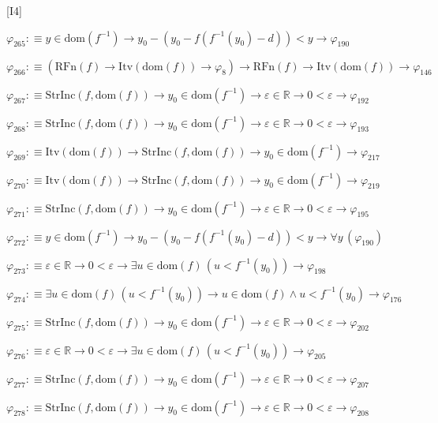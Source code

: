 \begin{fullproof}{[I4]}
\begin{abbrevlist}
\item $\varphi_{265} :\equiv y \in \mathrm{dom}(f^{-1}) \to y_{0} - (y_{0} - f(f^{-1}(y_{0}) - d)) < y \to \varphi_{190}$
\item $\varphi_{266} :\equiv (\mathrm{RFn}(f) \to \mathrm{Itv}(\mathrm{dom}(f)) \to \varphi_{8}) \to \mathrm{RFn}(f) \to \mathrm{Itv}(\mathrm{dom}(f)) \to \varphi_{146}$
\item $\varphi_{267} :\equiv \mathrm{StrInc}(f,\mathrm{dom}(f)) \to y_{0} \in \mathrm{dom}(f^{-1}) \to \varepsilon \in \mathbb{R} \to 0 < \varepsilon \to \varphi_{192}$
\item $\varphi_{268} :\equiv \mathrm{StrInc}(f,\mathrm{dom}(f)) \to y_{0} \in \mathrm{dom}(f^{-1}) \to \varepsilon \in \mathbb{R} \to 0 < \varepsilon \to \varphi_{193}$
\item $\varphi_{269} :\equiv \mathrm{Itv}(\mathrm{dom}(f)) \to \mathrm{StrInc}(f,\mathrm{dom}(f)) \to y_{0} \in \mathrm{dom}(f^{-1}) \to \varphi_{217}$
\item $\varphi_{270} :\equiv \mathrm{Itv}(\mathrm{dom}(f)) \to \mathrm{StrInc}(f,\mathrm{dom}(f)) \to y_{0} \in \mathrm{dom}(f^{-1}) \to \varphi_{219}$
\item $\varphi_{271} :\equiv \mathrm{StrInc}(f,\mathrm{dom}(f)) \to y_{0} \in \mathrm{dom}(f^{-1}) \to \varepsilon \in \mathbb{R} \to 0 < \varepsilon \to \varphi_{195}$
\item $\varphi_{272} :\equiv y \in \mathrm{dom}(f^{-1}) \to y_{0} - (y_{0} - f(f^{-1}(y_{0}) - d)) < y \to \forall y\,(\varphi_{190})$
\item $\varphi_{273} :\equiv \varepsilon \in \mathbb{R} \to 0 < \varepsilon \to \exists u \in \mathrm{dom}(f)\,(u < f^{-1}(y_{0})) \to \varphi_{198}$
\item $\varphi_{274} :\equiv \exists u \in \mathrm{dom}(f)\,(u < f^{-1}(y_{0})) \to u \in \mathrm{dom}(f) \land u < f^{-1}(y_{0}) \to \varphi_{176}$
\item $\varphi_{275} :\equiv \mathrm{StrInc}(f,\mathrm{dom}(f)) \to y_{0} \in \mathrm{dom}(f^{-1}) \to \varepsilon \in \mathbb{R} \to 0 < \varepsilon \to \varphi_{202}$
\item $\varphi_{276} :\equiv \varepsilon \in \mathbb{R} \to 0 < \varepsilon \to \exists u \in \mathrm{dom}(f)\,(u < f^{-1}(y_{0})) \to \varphi_{205}$
\item $\varphi_{277} :\equiv \mathrm{StrInc}(f,\mathrm{dom}(f)) \to y_{0} \in \mathrm{dom}(f^{-1}) \to \varepsilon \in \mathbb{R} \to 0 < \varepsilon \to \varphi_{207}$
\item $\varphi_{278} :\equiv \mathrm{StrInc}(f,\mathrm{dom}(f)) \to y_{0} \in \mathrm{dom}(f^{-1}) \to \varepsilon \in \mathbb{R} \to 0 < \varepsilon \to \varphi_{208}$

\end{abbrevlist}
\end{fullproof}

